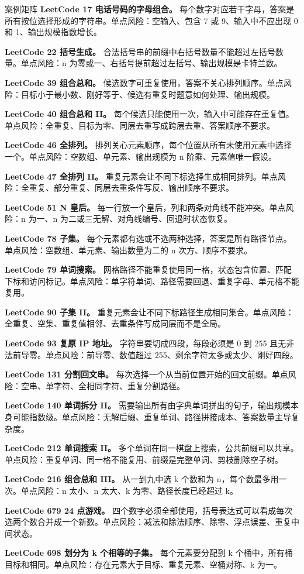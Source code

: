 \begin{principlebox}{案例矩阵}
\textbf{LeetCode 17 电话号码的字母组合。}
每个数字对应若干字母，答案是所有按位选择形成的字符串。单点风险：空输入、包含 7 或 9、输入中不应出现 0 和 1、输出规模指数增长。

\textbf{LeetCode 22 括号生成。}
合法括号串的前缀中右括号数量不能超过左括号数量。单点风险：n 为零或一、右括号提前超过左括号、输出规模是卡特兰数。

\textbf{LeetCode 39 组合总和。}
候选数字可重复使用，答案不关心排列顺序。单点风险：目标小于最小数、刚好等于、候选有重复时题意如何处理、输出规模。

\textbf{LeetCode 40 组合总和 II。}
每个候选只能使用一次，输入中可能存在重复值。单点风险：全重复、目标为零、同层去重写成跨层去重、答案顺序不要求。

\textbf{LeetCode 46 全排列。}
排列关心元素顺序，每个位置从所有未使用元素中选择一个。单点风险：空数组、单元素、输出规模为 n 阶乘、元素值唯一假设。

\textbf{LeetCode 47 全排列 II。}
重复元素会让不同下标选择生成相同排列。单点风险：全重复、部分重复、同层去重条件写反、输出顺序不要求。

\textbf{LeetCode 51 N 皇后。}
每一行放一个皇后，列和两条对角线不能冲突。单点风险：n 为一、n 为二或三无解、对角线编号、回退时状态恢复。

\textbf{LeetCode 78 子集。}
每个元素都有选或不选两种选择，答案是所有路径节点。单点风险：空数组、单元素、输出数量为二的 n 次方、顺序不要求。

\textbf{LeetCode 79 单词搜索。}
网格路径不能重复使用同一格，状态包含位置、匹配下标和访问标记。单点风险：单字符单词、路径需要回退、重复字母、单元格不能复用。

\textbf{LeetCode 90 子集 II。}
重复元素会让不同下标路径生成相同集合。单点风险：全重复、空集、重复值相邻、去重条件写成同层而不是全局。

\textbf{LeetCode 93 复原 IP 地址。}
字符串要切成四段，每段必须是 0 到 255 且无非法前导零。单点风险：前导零、数值超过 255、剩余字符太多或太少、刚好四段。

\textbf{LeetCode 131 分割回文串。}
每次选择一个从当前位置开始的回文前缀。单点风险：空串、单字符、全相同字符、重复分割路径。

\textbf{LeetCode 140 单词拆分 II。}
需要输出所有由字典单词拼出的句子，输出规模本身可能指数级。单点风险：无解后缀、重复单词、路径拼接成本、答案数量主导复杂度。

\textbf{LeetCode 212 单词搜索 II。}
多个单词在同一棋盘上搜索，公共前缀可以共享。单点风险：重复单词、同一格不能复用、前缀是完整单词、剪枝删除空子树。

\textbf{LeetCode 216 组合总和 III。}
从一到九中选 k 个数和为 n，每个数最多用一次。单点风险：n 太小、n 太大、k 为零、路径长度已经超过 k。

\textbf{LeetCode 679 24 点游戏。}
四个数字必须全部使用，括号表达式可以看成每次选两个数合并成一个新数。单点风险：减法和除法顺序、除零、浮点误差、重复中间状态。

\textbf{LeetCode 698 划分为 k 个相等的子集。}
每个元素要分配到 k 个桶中，所有桶目标和相同。单点风险：存在元素大于目标、重复元素、空桶对称、k 为一。

\end{principlebox}

